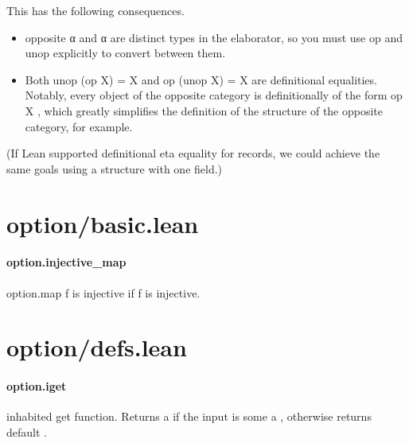\documentclass{article}
\begin{document}
This has the following consequences.
\begin{itemize}\item \colorbox[RGB]{253,246,227}{{{{\color[RGB]{101, 123, 131} opposite α }}}} and 
\colorbox[RGB]{253,246,227}{{{{\color[RGB]{101, 123, 131} α }}}} are distinct types in the elaborator, so you
must use 
\colorbox[RGB]{253,246,227}{{{{\color[RGB]{101, 123, 131} op }}}} and 
\colorbox[RGB]{253,246,227}{{{{\color[RGB]{101, 123, 131} unop }}}} explicitly to convert between them.

\item Both 
\colorbox[RGB]{253,246,227}{{{{\color[RGB]{101, 123, 131} unop (op X)  }}}{{{\color[RGB]{181, 137, 0} = }}}{{{\color[RGB]{101, 123, 131}  X }}}} and 
\colorbox[RGB]{253,246,227}{{{{\color[RGB]{101, 123, 131} op (unop X)  }}}{{{\color[RGB]{181, 137, 0} = }}}{{{\color[RGB]{101, 123, 131}  X }}}} are definitional
equalities. Notably, every object of the opposite category is
definitionally of the form 
\colorbox[RGB]{253,246,227}{{{{\color[RGB]{101, 123, 131} op X }}}}, which greatly simplifies the
definition of the structure of the opposite category, for example.

\end{itemize}\par
(If Lean supported definitional eta equality for records, we could
achieve the same goals using a structure with one field.)
\section{option/basic.lean}\paragraph{option.injective\_map}
\par
\colorbox[RGB]{253,246,227}{{{{\color[RGB]{101, 123, 131} option.map f }}}} is injective if 
\colorbox[RGB]{253,246,227}{{{{\color[RGB]{101, 123, 131} f }}}} is injective.
\section{option/defs.lean}\paragraph{option.iget}
\par
inhabited 
\colorbox[RGB]{253,246,227}{{{{\color[RGB]{101, 123, 131} get }}}} function. Returns 
\colorbox[RGB]{253,246,227}{{{{\color[RGB]{101, 123, 131} a }}}} if the input is 
\colorbox[RGB]{253,246,227}{{{{\color[RGB]{101, 123, 131} some a }}}},
otherwise returns 
\colorbox[RGB]{253,246,227}{{{{\color[RGB]{101, 123, 131} default }}}}.
\end{document}
